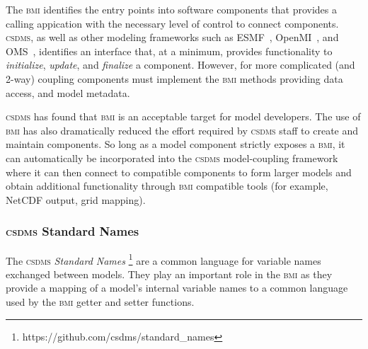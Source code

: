 \documentclass[11pt, oneside]{amsart}
\newcommand{\huttonnote}[1]{ {\textcolor{magenta}    { ***Eric:      #1 }}}
\DeclareRobustCommand{\csdms}{\textsc{csdms}}
\DeclareRobustCommand{\bmi}{\textsc{bmi}}
\begin{document}
The \bmi{} identifies the entry points into software components that provides a
calling appication with the necessary level of control to connect components.
\csdms, as well as other modeling frameworks such as
ESMF~\cite{hill2004architecture}, OpenMI~\cite{gregersen2007openmi}, and
OMS~\cite{david2002object}, identifies an interface that, at a minimum,
provides functionality to \emph{initialize}, \emph{update}, and
\emph{finalize} a component. However, for more complicated (and 2-way)
coupling components must implement the \bmi{} methods providing data access,
and model metadata.

\csdms{} has found that \bmi{} is an acceptable target for model developers.
The use of \bmi{} has also dramatically reduced the effort required by
\csdms{} staff to create and maintain components. So long as a model component
strictly exposes a \bmi{}, it can automatically be incorporated into the
\csdms{} model-coupling framework where it can then connect to compatible
components to form larger models and obtain additional functionality through
\bmi{} compatible tools (for example, NetCDF output, grid mapping).



\subsubsection{\csdms{} Standard Names}
\label{sec:standardnames}


The \csdms{} \emph{Standard Names}
\footnote{https://github.com/csdms/standard\_names}
are a common language for variable names exchanged between models. They play
an important role in the \bmi{} as they provide a mapping of a model's
internal variable names to a common language used by the \bmi{} getter and
setter functions.
\end{document}
